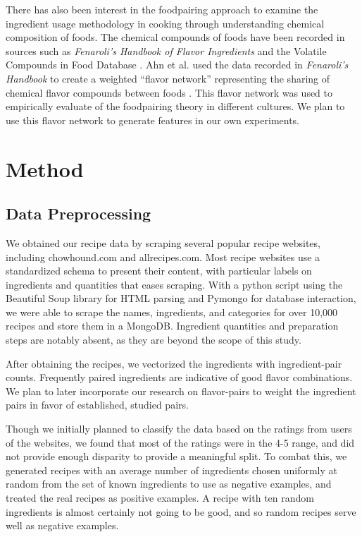 \documentclass{article}
\begin{document}
There has also been interest in the foodpairing approach to examine the ingredient usage methodology in cooking through understanding chemical composition of foods. The chemical compounds of foods have been recorded in sources such as \textit{Fenaroli's Handbook of Flavor Ingredients} \cite{burdock09} and the Volatile Compounds in Food Database \cite{leffingwell00}. Ahn et al. used the data recorded in \textit{Fenaroli's Handbook} to create a weighted “flavor network” representing the sharing of chemical flavor compounds between foods . This flavor network was used to empirically evaluate of the foodpairing theory in different cultures. We plan to use this flavor network to generate features in our own experiments.

\section{Method}
\subsection{Data Preprocessing}
We obtained our recipe data by scraping several popular recipe websites, including chowhound.com and allrecipes.com. Most recipe websites use a standardized schema to present their content, with particular labels on ingredients and quantities that eases scraping. With a python script using the Beautiful Soup library for HTML parsing and Pymongo for database interaction, we were able to scrape the names, ingredients, and categories for over 10,000 recipes and store them in a MongoDB. Ingredient quantities and preparation steps are notably absent, as they are beyond the scope of this study.

After obtaining the recipes, we vectorized the ingredients with ingredient-pair counts. Frequently paired ingredients are indicative of good flavor combinations. We plan to later incorporate our research on flavor-pairs to weight the ingredient pairs in favor of established, studied pairs.

Though we initially planned to classify the data based on the ratings from users of the websites, we found that most of the ratings were in the 4-5 range, and did not provide enough disparity to provide a meaningful split. To combat this, we generated recipes with an average number of ingredients chosen uniformly at random from the set of known ingredients to use as negative examples, and treated the real recipes as positive examples. A recipe with ten random ingredients is almost certainly not going to be good, and so random recipes serve well as negative examples.
\end{document}
